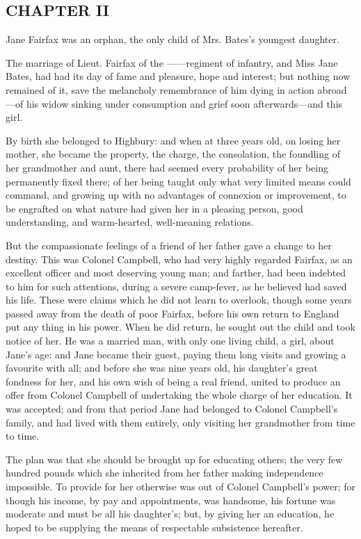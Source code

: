 \subsection[chapter-ii-1]{\useURL[url21][][][]\from[url21]CHAPTER II}

Jane Fairfax was an orphan, the only child of Mrs. Bates's youngest daughter.

The marriage of Lieut. Fairfax of the ------regiment of infantry, and Miss Jane Bates, had had its day of fame and pleasure, hope and interest; but nothing now remained of it, save the melancholy remembrance of him dying in action abroad---of his widow sinking under consumption and grief soon afterwards---and this girl.

By birth she belonged to Highbury: and when at three years old, on losing her mother, she became the property, the charge, the consolation, the foundling of her grandmother and aunt, there had seemed every probability of her being permanently fixed there; of her being taught only what very limited means could command, and growing up with no advantages of connexion or improvement, to be engrafted on what nature had given her in a pleasing person, good understanding, and warm-hearted, well-meaning relations.

But the compassionate feelings of a friend of her father gave a change to her destiny. This was Colonel Campbell, who had very highly regarded Fairfax, as an excellent officer and most deserving young man; and farther, had been indebted to him for such attentions, during a severe camp-fever, as he believed had saved his life. These were claims which he did not learn to overlook, though some years passed away from the death of poor Fairfax, before his own return to England put any thing in his power. When he did return, he sought out the child and took notice of her. He was a married man, with only one living child, a girl, about Jane's age: and Jane became their guest, paying them long visits and growing a favourite with all; and before she was nine years old, his daughter's great fondness for her, and his own wish of being a real friend, united to produce an offer from Colonel Campbell of undertaking the whole charge of her education. It was accepted; and from that period Jane had belonged to Colonel Campbell's family, and had lived with them entirely, only visiting her grandmother from time to time.

The plan was that she should be brought up for educating others; the very few hundred pounds which she inherited from her father making independence impossible. To provide for her otherwise was out of Colonel Campbell's power; for though his income, by pay and appointments, was handsome, his fortune was moderate and must be all his daughter's; but, by giving her an education, he hoped to be supplying the means of respectable subsistence hereafter.

